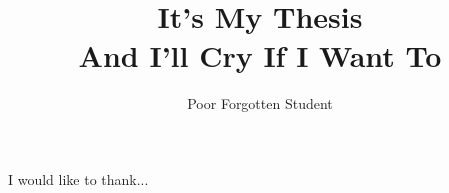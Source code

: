 \documentclass[11pt,PhD]{muthesis}
\begin{document}


\title{It's My Thesis\\
  And I'll Cry If I Want To}
\author{Poor Forgotten Student}

\beforeabstract
{}


I would like to thank...
\afterpreface


%
%

\appendix



             
  
\end{document}
